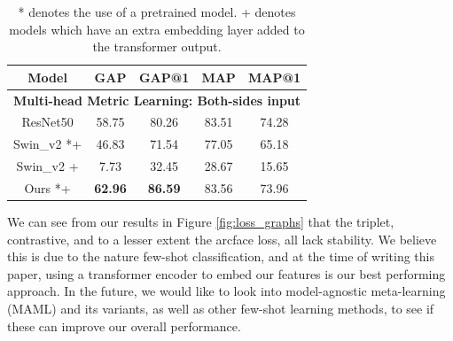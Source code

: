 \documentclass[10pt,twocolumn,letterpaper]{article}
\begin{document}
\begin{table}[h]
    \caption{* denotes the use of a pretrained model.  + denotes models which have an extra embedding layer added to the transformer output.}

    \begin{tabular}{|ccccc|}
    \hline
    \multicolumn{1}{|c|}{Model}       & \multicolumn{1}{c|}{GAP}   & \multicolumn{1}{c|}{GAP@1} & \multicolumn{1}{c|}{MAP}   & MAP@1 \\ \hline
    \multicolumn{5}{|c|}{\textbf{Multi-head Metric Learning: Both-sides input}}                                                      \\ \hline
    \multicolumn{1}{|c|}{ResNet50}    & \multicolumn{1}{c|}{58.75} & \multicolumn{1}{c|}{80.26} & \multicolumn{1}{c|}{83.51} & 74.28 \\ \hline
    \multicolumn{1}{|c|}{Swin\_v2 *+} & \multicolumn{1}{c|}{46.83} & \multicolumn{1}{c|}{71.54} & \multicolumn{1}{c|}{77.05} & 65.18 \\ \hline
    \multicolumn{1}{|c|}{Swin\_v2 +}  & \multicolumn{1}{c|}{7.73}  & \multicolumn{1}{c|}{32.45} & \multicolumn{1}{c|}{28.67} & 15.65 \\ \hline
    \multicolumn{1}{|c|}{Ours *+}   & \multicolumn{1}{c|}{\textbf{62.96}} & \multicolumn{1}{c|}{\textbf{86.59}} & \multicolumn{1}{c|}{83.56} & 73.96 \\ \hline
    \end{tabular}
    \label{tab:results}
\end{table}
We can see from our results in Figure \ref{fig:loss_graphs} that the triplet, contrastive, and to a lesser extent the arcface loss, all lack stability. 
We believe this is due to the nature few-shot classification, and at the time of writing this paper, using a transformer encoder to embed our features
is our best performing approach. In the future, we would like to look into model-agnostic meta-learning (MAML) \cite{maml} and its variants, as well as 
other few-shot learning methods, to see if these can improve our overall performance.
\end{document}
